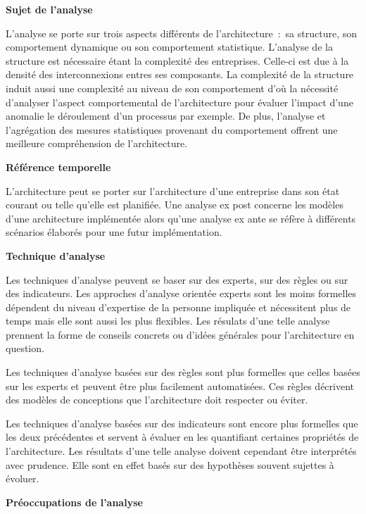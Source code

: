 	\begin{description}
	\item \textbf{Sujet de l'analyse} 

L'analyse se porte sur trois aspects différents de l'architecture~:~sa structure, son comportement dynamique ou son comportement statistique. L'analyse de la structure est nécessaire étant la complexité des entreprises. Celle-ci est due à la densité des interconnexions entres ses composants. La complexité de la structure induit aussi une complexité au niveau de son comportement d'où la nécessité d'analyser l'aspect comportemental de l'architecture pour évaluer l'impact d'une anomalie le déroulement d'un processus par exemple. De plus, l'analyse et l'agrégation des mesures statistiques provenant du comportement offrent une meilleure compréhension de l'architecture.

	\item \textbf{Référence temporelle}

L'architecture peut se porter sur l'architecture d'une entreprise dans son état courant ou telle qu'elle est planifiée. Une analyse ex post concerne les modèles d'une architecture implémentée alors qu'une analyse ex ante se réfère à différents scénarios élaborés pour une futur implémentation.

	\item \textbf{Technique d'analyse}

Les techniques d'analyse peuvent se baser sur des experts, sur des règles ou sur des indicateurs. Les approches d'analyse orientée experts sont les moins formelles dépendent du niveau d'expertise de la personne impliquée et nécessitent plus de temps mais elle sont aussi les plus flexibles. Les résulats d'une telle analyse prennent la forme de conseils concrets ou d'idées générales pour l'architecture en question.

Les techniques d'analyse basées sur des règles sont plus formelles que celles basées sur les experts et peuvent être plus facilement automatisées. Ces règles décrivent des modèles de conceptions que l'architecture doit respecter ou éviter. 

Les techniques d'analyse basées sur des indicateurs sont encore plus formelles que les deux précédentes et servent à évaluer en les quantifiant certaines propriétés de l'architecture. Les résultats d'une telle analyse doivent cependant être interprétés avec prudence. Elle sont en effet basés sur des hypothèses souvent sujettes à évoluer.

	\item \textbf{Préoccupations de l'analyse}


\end{description}
